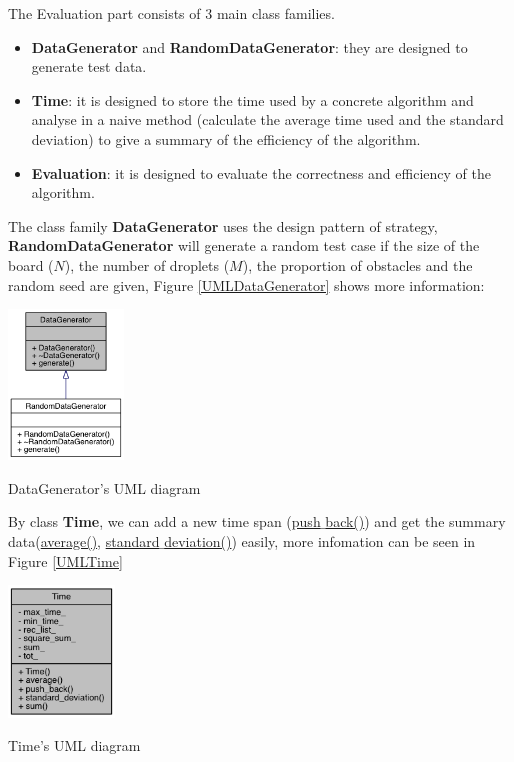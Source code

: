 \documentclass[twocolumn]{article}
\begin{document}
The Evaluation part consists of 3 main class families.

\begin{itemize}
    \item \textbf{DataGenerator} and \textbf{RandomDataGenerator}: they are designed to generate test data.
    \item \textbf{Time}: it is designed to store the time used by a concrete algorithm and analyse in a naive method (calculate the average time used and the standard deviation) to give a summary of the efficiency of the algorithm.
    \item \textbf{Evaluation}: it is designed to evaluate the correctness and efficiency of the algorithm.
\end{itemize}

The class family \textbf{DataGenerator} uses the design pattern of strategy, \textbf{RandomDataGenerator} will generate a random test case if the size of the board ($N$), the number of droplets ($M$), the proportion of obstacles and the random seed are given, Figure \ref{UMLDataGenerator} shows more information:

\begin{center}
\makeatletter
\def\@captype{figure}
\makeatother
\includegraphics [height=4cm]{UMLDataGenerator}
\caption{DataGenerator's UML diagram}
\label{UMLDataGenerator}
\end{center}

By class \textbf{Time}, we can add a new time span (\underline{push$\_$back()}) and get the summary data(\underline{average()}, \underline{standard$\_$deviation()}) easily, more infomation can be seen in Figure \ref{UMLTime}

\begin{center}
\makeatletter
\def\@captype{figure}
\makeatother
\includegraphics [height=3.5cm]{UMLTime}
\caption{Time's UML diagram}
\label{UMLTime}
\end{center}
\end{document}
